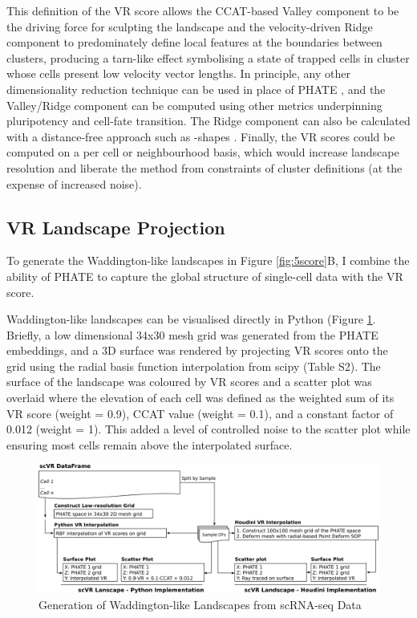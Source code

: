 This definition of the VR score allows the CCAT-based Valley component to be the driving force for sculpting the landscape and the velocity-driven Ridge component to predominately define local features at the boundaries between clusters, producing a tarn-like effect symbolising a state of trapped cells in cluster whose cells present low velocity vector lengths. In principle, any other dimensionality reduction technique can be used in place of PHATE \cite{chen_single-cell_2019}, and the Valley/Ridge component can be computed using other metrics underpinning pluripotency and cell-fate transition. The Ridge component can also be calculated with a distance-free approach such as \textalpha-shapes \cite{bellock_bellockkalphashape_2021}. Finally, the VR scores could be computed on a per cell or neighbourhood basis, which would increase landscape resolution and liberate the method from constraints of cluster definitions (at the expense of increased noise).

\subsection{VR Landscape Projection}

To generate the Waddington-like landscapes in Figure \ref{fig:5score}B, I combine the ability of PHATE to capture the global structure of single-cell data with the VR score.

Waddington-like landscapes can be visualised directly in Python (Figure \ref{fig:2land}. Briefly, a low dimensional 34x30 mesh grid was generated from the PHATE embeddings, and a 3D surface was rendered by projecting VR scores onto the grid using the radial basis function interpolation from scipy \cite{virtanen_scipy_2020} (Table S2). The surface of the landscape was coloured by VR scores and a scatter plot was overlaid where the elevation of each cell was defined as the weighted sum of its VR score (weight = 0.9), CCAT value (weight = 0.1), and a constant factor of 0.012 (weight = 1). This added a level of controlled noise to the scatter plot while ensuring most cells remain above the interpolated surface.

\begin{figure}
    \centering
    \includegraphics{02methods/figs/2VR_Landscape.png}
    \caption{Generation of Waddington-like Landscapes from scRNA-seq Data}
    \label{fig:2land}
\end{figure}

